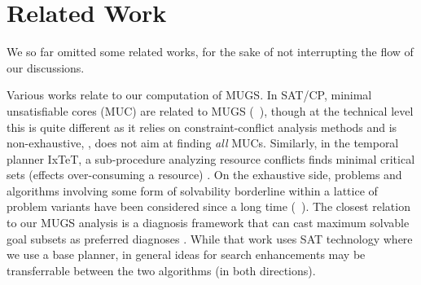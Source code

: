 \section{Related Work}
\label{related}



We so far omitted some related works, for the sake of not interrupting
the flow of our discussions.

Various works relate to our computation of MUGS. In SAT/CP, minimal
unsatisfiable cores (MUC) are related to MUGS
(\eg\ \cite{chinneck:2007,laborie:ecai-14}), though at the technical
level this is quite different as it relies on constraint-conflict
analysis methods and is non-exhaustive, \ie, does not aim at finding
\emph{all} MUCs. Similarly, in the temporal planner IxTeT, a
sub-procedure analyzing resource conflicts finds minimal critical sets
(effects over-consuming a resource)
\cite{laborie:ghallab:ijcai-95}. On the exhaustive side, problems and
algorithms involving some form of solvability borderline within a
lattice of problem variants have been considered since a long time
(\eg\ \cite{dekleer:ai-86:atms,reiter:ai-87}). The closest relation to
our MUGS analysis is a diagnosis framework that can cast maximum
solvable goal subsets as preferred diagnoses
\cite{grastien:etal:kr-12}. While that work uses SAT technology where
we use a base planner, in general ideas for search enhancements may be
transferrable between the two algorithms (in both directions).

